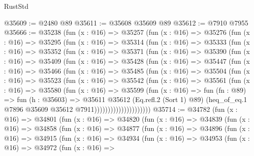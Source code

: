 \begin{lexlean}{RustStd}
\begin{coremodule}
@35609 := @2480 @89
@35611 := @35608 @35609 @89
@35612 := @7910 @7955
@35666 := @35238
    (fun (x : @16) =>
    @35257
      (fun (x : @16) =>
      @35276
        (fun (x : @16) =>
        @35295
          (fun (x : @16) =>
          @35314
            (fun (x : @16) =>
            @35333
              (fun (x : @16) =>
              @35352
                (fun (x : @16) =>
                @35371
                  (fun (x : @16) =>
                  @35390
                    (fun (x : @16) =>
                    @35409
                      (fun (x : @16) =>
                      @35428
                        (fun (x : @16) =>
                        @35447
                          (fun (x : @16) =>
                          @35466
                            (fun (x : @16) =>
                            @35485
                              (fun (x : @16) =>
                              @35504
                                (fun (x : @16) =>
                                @35523
                                  (fun (x : @16) =>
                                  @35542
                                    (fun (x : @16) =>
                                    @35561
                                      (fun (x : @16) =>
                                      @35580
                                        (fun (x : @16) =>
                                        @35599
                                          (fun (x : @16) =>
                                          fun (fn : @89) =>
                                          fun (h : @35603) =>
                                          @35611
                                            @35612
                                            (Eq.refl.{2} (Sort 1) @89)
                                            (heq_of_eq.{1}
                                              @7896
                                              @35609
                                              @35612
                                              @7911)))))))))))))))))))))
@35714 := @34782
    (fun (x : @16) =>
    @34801
      (fun (x : @16) =>
      @34820
        (fun (x : @16) =>
        @34839
          (fun (x : @16) =>
          @34858
            (fun (x : @16) =>
            @34877
              (fun (x : @16) =>
              @34896
                (fun (x : @16) =>
                @34915
                  (fun (x : @16) =>
                  @34934
                    (fun (x : @16) =>
                    @34953
                      (fun (x : @16) =>
                      @34972
                        (fun (x : @16) =>

\end{coremodule}
\end{lexlean}
